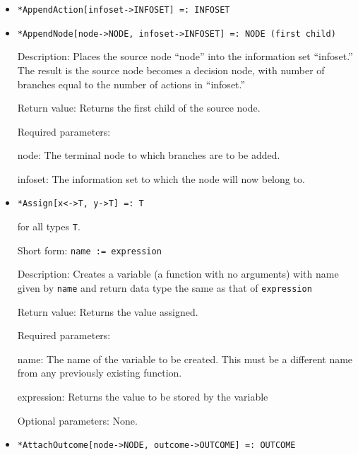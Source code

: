 \begin{itemize}
\item
\protect \large \begin{verbatim}
*AppendAction[infoset->INFOSET] =: INFOSET
\end{verbatim}\normalsize

\item
\protect \large \begin{verbatim} 
*AppendNode[node->NODE, infoset->INFOSET] =: NODE (first child)
\end{verbatim}\normalsize

\bd
\item
[Description:] Places the source node ``node'' into the information set
``infoset.''  The result is the source node becomes a decision node,
with number of branches equal to the number of actions in ``infoset.''

\item
[Return value:] Returns the first child of the source node.
\item
[Required parameters:]\hfil\null
\par
\bd
\item
[node:] The terminal node to which branches are to be added.
\item
[infoset:] The information set to which the node will now belong to.
\ed
\ed

\item 
\protect \large \begin{verbatim}
*Assign[x<->T, y->T] =: T
\end{verbatim} \normalsize
for all types {\tt T}.
\bd
\item
[Short form:] \verb+name := expression+
\item
[Description:] Creates a variable (a function with no arguments) with name
given by \verb+name+ and return data type the same as that of
\verb+expression+
\item
[Return value:] Returns the value assigned.
\item
[Required parameters:]\hfil\null
\bd
\item
[name:] The name of the variable to be created.  This must be a different
name from any previously existing function.  
\item
[expression:] Returns the value to be stored by the variable
\ed
\item
[Optional parameters:] None.
\ed

\item
\protect \large \begin{verbatim} 
*AttachOutcome[node->NODE, outcome->OUTCOME] =: OUTCOME
\end{verbatim}\normalsize


\end{itemize}
